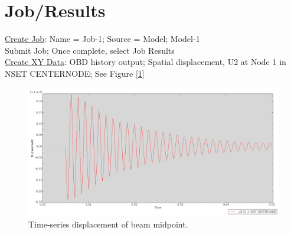 \documentclass{article}
\begin{document}
	\section{Job/Results}
	\underline{Create Job}: Name = Job-1; Source = Model; Model-1\\
	Submit Job; Once complete, select Job Results\\
	
	\underline{Create XY Data}: OBD history output; Spatial displacement, U2 at Node 1 in NSET CENTERNODE; See Figure [\ref{fig:displacement}]
	\begin{figure}[H]
		\centering
		\includegraphics[width=6in]{Figures/Midpoint_U2displacement.png}
		\caption{Time-series displacement of beam midpoint.}
		\label{fig:displacement}
	\end{figure}
	
\end{document}
